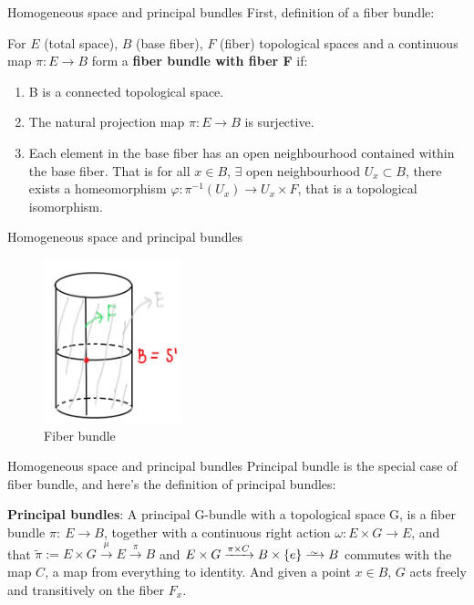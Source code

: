 \documentclass[smaller,xcolor=dvipsnames]{beamer}
\begin{document}
\begin{frame}{Homogeneous space and principal bundles}
First, definition of a fiber bundle:\\
    \begin{definition}
    For $E$ (total space), $B$ (base fiber), $F$ (fiber) topological spaces and a continuous map $\pi : E \rightarrow B$ form a \textbf{fiber bundle with fiber F} if:
    \begin{enumerate}
        \item B is a connected topological space.
        \item The natural projection map $\pi: E \rightarrow B$ is surjective.
        \item Each element in the base fiber has an open neighbourhood contained within the base fiber. That is for all $x \in B$, $\exists$ open neighbourhood $U_{x} \subset B$, there exists a homeomorphism $\varphi: \pi^{-1}(U_{x})\rightarrow U_{x}\times F$, that is a topological isomorphism.
    \end{enumerate}
    \end{definition}
\end{frame}

\begin{frame}{Homogeneous space and principal bundles}
    \begin{figure}[tb]
\centering
\includegraphics[width=40mm]{fiber bundle.png} 
\caption{Fiber bundle}
\end{figure}
\end{frame}

\newcommand{\iso}{\xrightarrow{
   \,\smash{\raisebox{-0.65ex}{\ensuremath{\scriptstyle\sim}}}\,}}
\begin{frame}{Homogeneous space and principal bundles}
    Principal bundle is the special case of fiber bundle, and here's the definition of principal bundles:
    \pause
    \begin{definition}
        \textbf{Principal bundles}: A principal G-bundle with a topological space G, is a fiber bundle $\pi:\ E\rightarrow B$, together with a continuous right action $\omega: E\times G \rightarrow E$, and that $\tilde{\pi}:= E\times G \xrightarrow{\mu} E \xrightarrow{\pi} B$ \newline{}and $E\times G \xrightarrow{\pi \times C} B \times \{e \} \iso B$ commutes with the map $C$, a map from everything to identity.
        And given a point $x\in B$, $G$ acts freely and transitively on the fiber $F_{x}$.
        

    \end{definition}
\end{frame}
\end{document}
